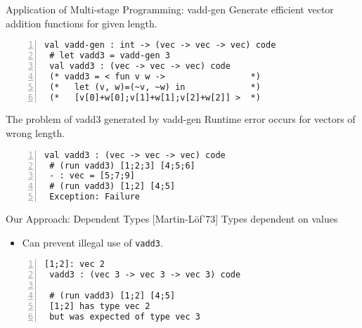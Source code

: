 \documentclass[dvipdfmx,aspectratio=169, 20pt]{beamer}
\renewcommand{\V}{\vdash}
\begin{document}
\begin{frame}[fragile]{Application of Multi-stage Programming: vadd-gen}
    Generate efficient vector addition functions for given length.
    \begin{exampleblock}{}
    \begin{Verbatim}[numbers=left]
 val vadd-gen : int -> (vec -> vec -> vec) code
 # let vadd3 = vadd-gen 3
 val vadd3 : (vec -> vec -> vec) code
 (* vadd3 = < fun v w ->                 *)
 (*   let (v, w)=(~v, ~w) in             *)
 (*   [v[0]+w[0];v[1]+w[1];v[2]+w[2]] >  *)
    \end{Verbatim}
    \end{exampleblock}
    \note{
    }
\end{frame}

\begin{frame}[fragile]{The problem of vadd3 generated by vadd-gen}
    Runtime error occurs for vectors of wrong length.
    \begin{exampleblock}{}
    \begin{Verbatim}[numbers=left]
 val vadd3 : (vec -> vec -> vec) code
 # (run vadd3) [1;2;3] [4;5;6]
 - : vec = [5;7;9]
 # (run vadd3) [1;2] [4;5]
 Exception: Failure
    \end{Verbatim}
    \end{exampleblock}
    \note{
    }
\end{frame}

\begin{frame}[fragile]{Our Approach: Dependent Types [Martin-L{\"o}f'73]}
    \renewcommand{\V}{\text{vec}\ }
    Types dependent on values
    \begin{itemize}
        \item Can prevent illegal use of {\verb|vadd3|}.
    \end{itemize}
    \begin{exampleblock}{}
 \begin{Verbatim}[numbers=left]
 [1;2]: vec 2
 vadd3 : (vec 3 -> vec 3 -> vec 3) code

 # (run vadd3) [1;2] [4;5]
 [1;2] has type vec 2
 but was expected of type vec 3
 \end{Verbatim}
    \end{exampleblock}
\end{frame}
\end{document}
